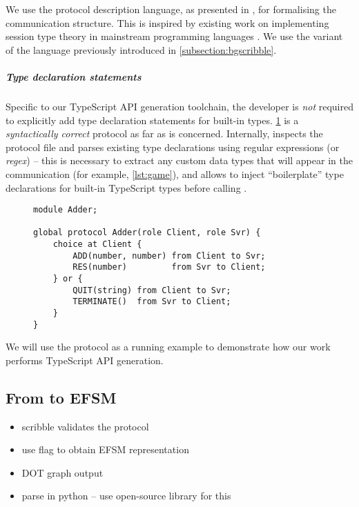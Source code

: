We use the  protocol description language, 
as presented in
\cite{Scribble}, for formalising the communication structure. This is
inspired by existing work on implementing session type theory 
in mainstream programming languages
\cite{Hybrid2016, PureScript2019, Python2017}. 
We use the variant of the  language 
previously introduced in \cref{subsection:bgscribble}.

\subparagraph{Type declaration statements}
Specific to our TypeScript API generation toolchain,
the developer is \textit{not} required to explicitly
add type declaration statements for built-in types.
\cref{lst:adder} is a \textit{syntactically correct}
 protocol as far as 
 is concerned. 
Internally,  inspects the protocol file
and parses existing type declarations using regular expressions
(or \textit{regex}) -- this is necessary to extract any
custom data types that will appear in the communication (for example,
\cref{lst:game}), and allows  to inject
``boilerplate'' type declarations for built-in TypeScript types before
calling .

\begin{figure}[!ht]
\begin{lstlisting}[language=Scribble]
module Adder;

global protocol Adder(role Client, role Svr) {
	choice at Client {
		ADD(number, number) from Client to Svr;
		RES(number)         from Svr to Client;	
	} or {
		QUIT(string) from Client to Svr;	
		TERMINATE()  from Svr to Client;
	}
}
\end{lstlisting}
\label{lst:adder}
\end{figure}

We will use the  protocol as a running example
to demonstrate how our work performs TypeScript API generation.

\subsection{From  to EFSM}
\label{subsection:efsm}

\begin{itemize}
\item scribble validates the protocol
\item use flag to obtain EFSM representation
\item DOT graph output
\item parse in python -- use open-source library for this
\end{itemize}

